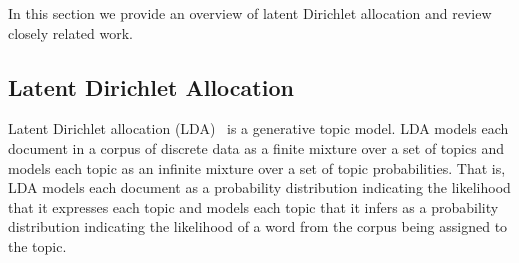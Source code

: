 
In this section we provide an overview of latent Dirichlet allocation and review closely related work.

%


\subsection{Latent Dirichlet Allocation}

Latent Dirichlet allocation (LDA)~\cite{Blei-etal:2003} is a generative topic model.
LDA models each document in a corpus of discrete data as a finite mixture over a set of topics
and models each topic as an infinite mixture over a set of topic probabilities.
That is, LDA models each document as a probability distribution
indicating the likelihood that it expresses each topic and
models each topic that it infers as a probability distribution
indicating the likelihood of a word from the corpus being assigned to the topic.



